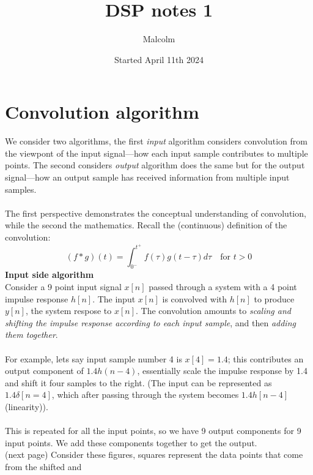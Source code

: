 \documentclass{report}
\title{DSP notes 1}
\date{Started April 11th 2024}
\author{Malcolm}
\begin{document}
\maketitle

\tableofcontents

\newpage
\section{Convolution algorithm}
We consider two algorithms, the first \textit{input} algorithm considers convolution from the 
viewpont of the input signal---how each input sample contributes to
multiple points. The second considers \textit{output} algorithm does the same but for the output signal---how 
an output sample has received information from multiple input samples.\\
\vspace{1mm}\\
The first perspective demonstrates the conceptual understanding of convolution, while the second the mathematics.
Recall the (continuous) definition of the convolution:
\begin{equation*}
(f*g)(t)=\int^{t^+}_{0^-}f(\tau)g(t-\tau)d\tau\quad\text{for }t>0
\end{equation*}
\noindent\textbf{Input side algorithm}\\
Consider a 9 point input signal $x[n]$ passed through a system with a 4 point impulse response $h[n]$.  
The input $x[n]$ is convolved
with $h[n]$ to produce $y[n]$, the system respose to $x[n]$. The convolution amounts to 
\textit{scaling and shifting the impulse response according to each input sample}, and then \textit{adding
them together}.\\
\vspace{1mm}\\
For example, lets say input sample number 4 is $x[4]=1.4$; this contributes an output component of $1.4h(n-4)$, 
essentially
scale the impulse response by 1.4 and shift it four samples to the right. (The input can be represented
as $1.4\delta[n=4]$, which after passing through the system becomes $1.4h[n-4]$ (linearity)).\\
\vspace{1mm}\\
This is repeated for all the input points, so we have 9 output components for 9 input points. We add these 
components together to get the output.\\
(next page)\newpage
\noindent Consider these figures, squares represent the data points that come from the shifted and
\end{document}
